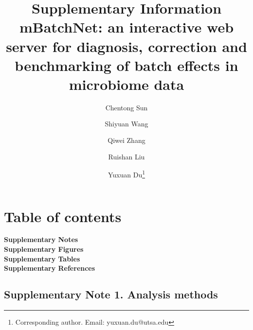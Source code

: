 \documentclass[11pt,letterpaper]{article}
\begin{document}
\thispagestyle{empty}

\title{{\huge \textbf{Supplementary Information}}\\
mBatchNet: an interactive web server for diagnosis, correction and benchmarking of batch effects in microbiome data}

\author[1,2]{Chentong Sun}
\author[1]{Shiyuan Wang}
\author[1]{Qiwei Zhang}
\author[3]{Ruishan Liu}
\author[1]{Yuxuan Du\thanks{Corresponding author. Email: yuxuan.du@utsa.edu}}


\renewcommand*{\Affilfont}{\small}
\renewcommand\Authands{ and }

\date{}
\maketitle

\section*{Table of contents}

\noindent \textbf{Supplementary Notes}
\hfill \pageref{sec:supp-notes}\\

\noindent \textbf{Supplementary Figures}
\hfill \pageref{sec:supp-figures}\\

\noindent \textbf{Supplementary Tables}
\hfill \pageref{sec:supp-tables}\\

\noindent \textbf{Supplementary References}
\hfill \pageref{sec:supp-refs}\\


\newpage
{}
\label{sec:supp-notes}


\newpage
\subsection*{Supplementary Note 1. Analysis methods}
\label{sec:supp-note2}
\end{document}
